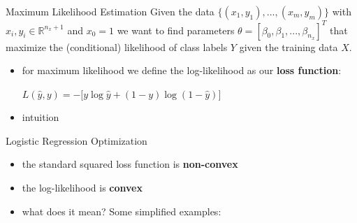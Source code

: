 \documentclass{beamer}
\begin{document}
\begin{frame}{Maximum Likelihood Estimation}
Given the data $\{(x_1, y_1), ..., (x_m, y_m)\}$ with $x_i,y_i \in \mathbb{R}^{n_x+1}$ and $x_0 = 1$ we want to find parameters $\theta=[\beta_0, \beta_1,...,\beta_{n_x}]^T$ that maximize the (conditional) likelihood of class labels $Y$ given the training data $X$.

\begin{itemize}
\item for maximum likelihood we define the log-likelihood as our \textbf{loss function}: 
  \begin{center}
  $L(\hat{y}, y) = - \big[y \log \hat{y} + (1-y) \log (1-\hat{y})\big]$
  \end{center}
\item intuition  
\end{itemize}
\end{frame}

\begin{frame}{Logistic Regression Optimization}
\begin{itemize}
\item the standard squared loss function is \textbf{non-convex}
\item the log-likelihood is \textbf{convex}
\item what does it mean? Some simplified examples:
\end{itemize}


\end{frame}
\end{document}

